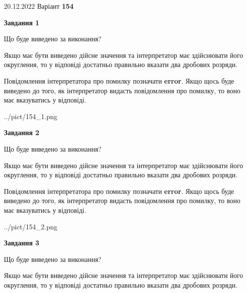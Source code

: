 \documentclass[12pt, ukrainian]{article}
\begin{document}
{20.12.2022 Варіант \No \textbf { 154 }\par}
{
\begin {Large}

{\begin {center}\textbf{Завдання 1}\end {center}}\par
Що буде виведено за виконання? \par

Якщо має бути виведено дійсне значення та інтерпретатор має здійснювати його округлення, 
то у відповіді достатньо правильно вказати два дробових розряди.

Повідомлення інтерпретатора про помилку позначати \textbf{error}.
Якщо щось буде виведено до того, як інтерпретатор видасть повідомлення про помилку, 
то воно має вказуватись у відповіді. \par

\begin{center}
	{../pict/154_1.png}
\end{center}
\newpage

{\begin {center}\textbf{Завдання 2}\end {center}}\par
Що буде виведено за виконання? \par

Якщо має бути виведено дійсне значення та інтерпретатор має здійснювати його округлення, 
то у відповіді достатньо правильно вказати два дробових розряди.

Повідомлення інтерпретатора про помилку позначати \textbf{error}.
Якщо щось буде виведено до того, як інтерпретатор видасть повідомлення про помилку, 
то воно має вказуватись у відповіді. \par

\begin{center}
	{../pict/154_2.png}
\end{center}
\newpage

{\begin {center}\textbf{Завдання 3}\end {center}}\par
Що буде виведено за виконання? \par

Якщо має бути виведено дійсне значення та інтерпретатор має здійснювати його округлення, 
то у відповіді достатньо правильно вказати два дробових розряди.


\end{Large}}
\end{document}
